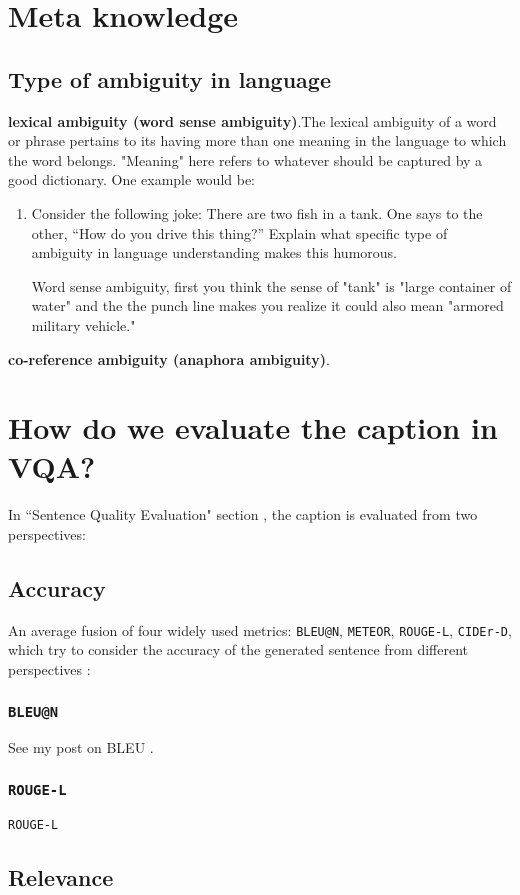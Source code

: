 \documentclass[12pt]{article}
\newenvironment{QandA}{\begin{enumerate}\bfseries}
                      {\end{enumerate}}
\newenvironment{answered}{\par\normalfont}{}
\begin{document}
\section{Meta knowledge}

\subsection{Type of ambiguity in language}

\noindent\textbf{lexical ambiguity (word sense ambiguity)}.The lexical ambiguity of a word or phrase pertains to its having more than one meaning in the language to which the word belongs. "Meaning" here refers to whatever should be captured by a good dictionary. One example would be:

\begin{QandA}
\item Consider the following joke: There are two fish in a tank.  One says to the other, ``How do you drive this thing?'' Explain what specific type of ambiguity in language understanding makes this humorous.
	\begin{answered}
	Word sense ambiguity, first you think the sense of "tank" is "large container of water" and the the punch line makes you realize it could also mean "armored military vehicle."
	\end{answered}
\end{QandA}

\noindent\textbf{co-reference ambiguity (anaphora ambiguity)}.

\section{How do we evaluate the caption in VQA?}

In ``Sentence Quality Evaluation" section \cite{Li2018TellandAnswerTE}, the caption is evaluated from two perspectives:

\subsection{Accuracy}

An average fusion of four widely used metrics: \texttt{BLEU@N}, \texttt{METEOR},
\texttt{ROUGE-L}, \texttt{CIDEr-D}, which try to consider the accuracy of the generated sentence from different perspectives \cite{Chen2015MicrosoftCC}:

\subsubsection{\texttt{BLEU@N}} 

See my post \cite{bleu-post} on BLEU \cite{Papineni:2002:BMA:1073083.1073135}.

\subsubsection{\texttt{ROUGE-L}}

\texttt{ROUGE-L} 

\subsection{Relevance}






\end{document}
